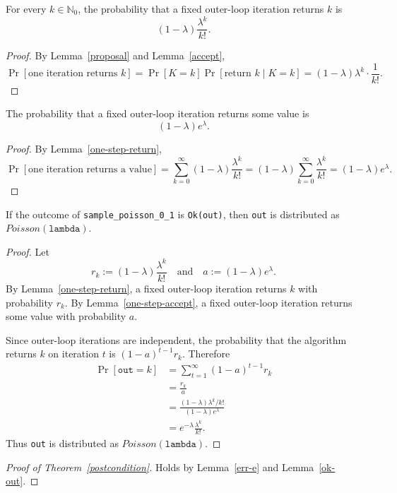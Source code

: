 \documentclass{article}
\begin{document}
\begin{lemma}
\label{one-step-return}
For every $k \in \mathbb{N}_0$, the probability that a fixed outer-loop iteration returns $k$ is
\[
(1-\lambda)\frac{\lambda^k}{k!}.
\]
\end{lemma}

\begin{proof}
By Lemma~\ref{proposal} and Lemma~\ref{accept},
\[
\Pr[\text{one iteration returns }k]
=
\Pr[K=k]\Pr[\text{return }k \mid K=k]
=
(1-\lambda)\lambda^k \cdot \frac{1}{k!}.
\]
\end{proof}

\begin{lemma}
\label{one-step-accept}
The probability that a fixed outer-loop iteration returns some value is
\[
(1-\lambda)e^\lambda.
\]
\end{lemma}

\begin{proof}
By Lemma~\ref{one-step-return},
\[
\Pr[\text{one iteration returns a value}]
=
\sum_{k=0}^\infty (1-\lambda)\frac{\lambda^k}{k!}
=
(1-\lambda)\sum_{k=0}^\infty \frac{\lambda^k}{k!}
=
(1-\lambda)e^\lambda.
\]
\end{proof}

\begin{lemma}
\label{ok-out}
If the outcome of \texttt{sample\_poisson\_0\_1} is \texttt{Ok(out)}, then \texttt{out} is distributed as $Poisson(\texttt{lambda})$.
\end{lemma}

\begin{proof}
Let
\[
r_k := (1-\lambda)\frac{\lambda^k}{k!}
\quad\text{and}\quad
a := (1-\lambda)e^\lambda.
\]
By Lemma~\ref{one-step-return}, a fixed outer-loop iteration returns $k$ with probability $r_k$.
By Lemma~\ref{one-step-accept}, a fixed outer-loop iteration returns some value with probability $a$.

Since outer-loop iterations are independent, the probability that the algorithm returns $k$
on iteration $t$ is $(1-a)^{t-1}r_k$. Therefore
\begin{align*}
\Pr[\texttt{out}=k]
&= \sum_{t=1}^\infty (1-a)^{t-1}r_k \\
&= \frac{r_k}{a} \\
&= \frac{(1-\lambda)\lambda^k/k!}{(1-\lambda)e^\lambda} \\
&= e^{-\lambda}\frac{\lambda^k}{k!}.
\end{align*}
Thus \texttt{out} is distributed as $Poisson(\texttt{lambda})$.
\end{proof}

\begin{proof}[Proof of Theorem~\ref{postcondition}]
Holds by Lemma~\ref{err-e} and Lemma~\ref{ok-out}.
\end{proof}



\end{document}
